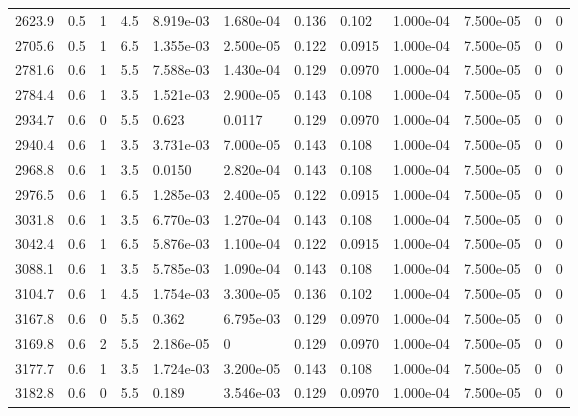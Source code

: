 \documentclass[preview]{standalone}
\begin{document}
{{{\begin{tabular}{L{1.2cm}C{1.2cm} C{0.3cm}C{0.5cm} C{1.4cm}C{1.4cm} C{1.4cm}C{1.4cm} C{1.6cm}C{1.6cm} C{1.6cm}C{1.6cm}}
  2623.9  &   0.5  & 1     & 4.5 &  8.919e-03  & 1.680e-04  &  0.136&   0.102& 1.000e-04 & 7.500e-05   &  0 & 0  \\ 
  2705.6  &   0.5  & 1     & 6.5 &  1.355e-03  & 2.500e-05  &  0.122&   0.0915& 1.000e-04 & 7.500e-05   &  0 & 0  \\ 
  2781.6  &   0.6  & 1     & 5.5 &  7.588e-03  & 1.430e-04  &  0.129&   0.0970& 1.000e-04 & 7.500e-05   &  0 & 0  \\ 
  2784.4  &   0.6  & 1     & 3.5 &  1.521e-03  & 2.900e-05  &  0.143&   0.108& 1.000e-04 & 7.500e-05   &  0 & 0  \\ 
  2934.7  &   0.6  & 0     & 5.5 &  0.623  & 0.0117  &  0.129&   0.0970& 1.000e-04 & 7.500e-05   &  0 & 0  \\ 
  2940.4  &   0.6  & 1     & 3.5 &  3.731e-03  & 7.000e-05  &  0.143&   0.108& 1.000e-04 & 7.500e-05   &  0 & 0  \\ 
  2968.8  &   0.6  & 1     & 3.5 &  0.0150  & 2.820e-04  &  0.143&   0.108& 1.000e-04 & 7.500e-05   &  0 & 0  \\ 
  2976.5  &   0.6  & 1     & 6.5 &  1.285e-03  & 2.400e-05  &  0.122&   0.0915& 1.000e-04 & 7.500e-05   &  0 & 0  \\ 
  3031.8  &   0.6  & 1     & 3.5 &  6.770e-03  & 1.270e-04  &  0.143&   0.108& 1.000e-04 & 7.500e-05   &  0 & 0  \\ 
  3042.4  &   0.6  & 1     & 6.5 &  5.876e-03  & 1.100e-04  &  0.122&   0.0915& 1.000e-04 & 7.500e-05   &  0 & 0  \\ 
  3088.1  &   0.6  & 1     & 3.5 &  5.785e-03  & 1.090e-04  &  0.143&   0.108& 1.000e-04 & 7.500e-05   &  0 & 0  \\ 
  3104.7  &   0.6  & 1     & 4.5 &  1.754e-03  & 3.300e-05  &  0.136&   0.102& 1.000e-04 & 7.500e-05   &  0 & 0  \\ 
  3167.8  &   0.6  & 0     & 5.5 &  0.362  & 6.795e-03  &  0.129&   0.0970& 1.000e-04 & 7.500e-05   &  0 & 0  \\ 
  3169.8  &   0.6  & 2     & 5.5 &  2.186e-05  & 0  &  0.129&   0.0970& 1.000e-04 & 7.500e-05   &  0 & 0  \\ 
  3177.7  &   0.6  & 1     & 3.5 &  1.724e-03  & 3.200e-05  &  0.143&   0.108& 1.000e-04 & 7.500e-05   &  0 & 0  \\ 
  3182.8  &   0.6  & 0     & 5.5 &  0.189  & 3.546e-03  &  0.129&   0.0970& 1.000e-04 & 7.500e-05   &  0 & 0  \\ 
\hline 
\end{tabular} 

}}}
\end{document}
